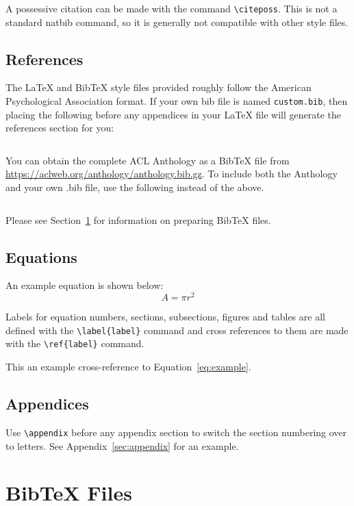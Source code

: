 \documentclass[11pt]{article}
\begin{document}
A possessive citation can be made with the command \verb|\citeposs|.
This is not a standard natbib command, so it is generally not compatible
with other style files.

\subsection{References}

\nocite{Ando2005,andrew2007scalable,rasooli-tetrault-2015}

The \LaTeX{} and Bib\TeX{} style files provided roughly follow the American Psychological Association format.
If your own bib file is named \texttt{custom.bib}, then placing the following before any appendices in your \LaTeX{} file will generate the references section for you:
\begin{quote}
\begin{verbatim}

\end{verbatim}
\end{quote}

You can obtain the complete ACL Anthology as a Bib\TeX{} file from \url{https://aclweb.org/anthology/anthology.bib.gz}.
To include both the Anthology and your own .bib file, use the following instead of the above.
\begin{quote}
\begin{verbatim}

\end{verbatim}
\end{quote}

Please see Section~\ref{sec:bibtex} for information on preparing Bib\TeX{} files.

\subsection{Equations}

An example equation is shown below:
\begin{equation}
  \label{eq:example}
  A = \pi r^2
\end{equation}

Labels for equation numbers, sections, subsections, figures and tables
are all defined with the \verb|\label{label}| command and cross references
to them are made with the \verb|\ref{label}| command.

This an example cross-reference to Equation~\ref{eq:example}.

\subsection{Appendices}

Use \verb|\appendix| before any appendix section to switch the section numbering over to letters. See Appendix~\ref{sec:appendix} for an example.

\section{Bib\TeX{} Files}
\label{sec:bibtex}
\end{document}
